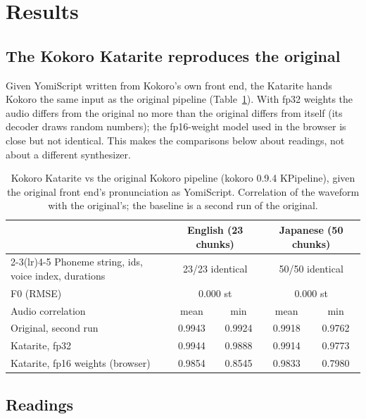 \documentclass[11pt,a4paper]{article}
\begin{document}
\section{Results}\label{sec:results}

\subsection{The Kokoro Katarite reproduces the original}\label{sec:parity}

Given YomiScript written from Kokoro's own front end, the Katarite hands Kokoro the same input as the original
pipeline (Table~\ref{tab:parity}). With fp32 weights the audio differs from the original no more than the original
differs from itself (its decoder draws random numbers); the fp16-weight model used in the browser is close but not
identical. This makes the comparisons below about readings, not about a different synthesizer.

\begin{table}[t]
\centering\small
\caption{Kokoro Katarite vs the original Kokoro pipeline (kokoro 0.9.4 KPipeline), given the original front end's
pronunciation as YomiScript. Correlation of the waveform with the original's; the baseline is a second run of the original.}
\label{tab:parity}
\begin{tabular}{lcccc}
\toprule
& \multicolumn{2}{c}{English (23 chunks)} & \multicolumn{2}{c}{Japanese (50 chunks)}\\
\cmidrule(lr){2-3}\cmidrule(lr){4-5}
Phoneme string, ids, voice index, durations & \multicolumn{2}{c}{23/23 identical} & \multicolumn{2}{c}{50/50 identical}\\
F0 (RMSE) & \multicolumn{2}{c}{0.000 st} & \multicolumn{2}{c}{0.000 st}\\
\midrule
Audio correlation & mean & min & mean & min\\
Original, second run & 0.9943 & 0.9924 & 0.9918 & 0.9762\\
Katarite, fp32 & 0.9944 & 0.9888 & 0.9914 & 0.9773\\
Katarite, fp16 weights (browser) & 0.9854 & 0.8545 & 0.9833 & 0.7980\\
\bottomrule
\end{tabular}
\end{table}

\subsection{Readings}
\end{document}
